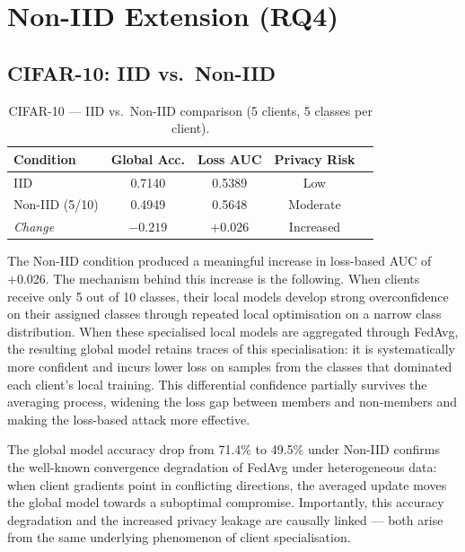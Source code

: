 \documentclass[12pt, a4paper]{report}
\begin{document}
\section{Non-IID Extension (RQ4)}

\subsection{CIFAR-10: IID vs.\ Non-IID}

\begin{table}[H]
  \centering
  \caption{CIFAR-10 --- IID vs.\ Non-IID comparison (5 clients, 5 classes per client).}
  \label{tab:noniid_cifar10}
  \begin{tabular}{lcccc}
    \toprule
    \textbf{Condition} & \textbf{Global Acc.} & \textbf{Loss AUC} & \textbf{Privacy Risk} \\
    \midrule
    IID             & 0.7140 & 0.5389 & Low \\
    Non-IID (5/10)  & 0.4949 & 0.5648 & Moderate \\
    \midrule
    \textit{Change} & $-0.219$ & $\mathbf{+0.026}$ & Increased \\
    \bottomrule
  \end{tabular}
\end{table}

The Non-IID condition produced a meaningful increase in loss-based AUC of +0.026.
The mechanism behind this increase is the following. When clients receive only
5 out of 10 classes, their local models develop strong overconfidence on their
assigned classes through repeated local optimisation on a narrow class distribution.
When these specialised local models are aggregated through FedAvg, the resulting
global model retains traces of this specialisation: it is systematically more
confident and incurs lower loss on samples from the classes that dominated each
client's local training. This differential confidence partially survives the
averaging process, widening the loss gap between members and non-members and
making the loss-based attack more effective.

The global model accuracy drop from 71.4\% to 49.5\% under Non-IID confirms
the well-known convergence degradation of FedAvg under heterogeneous data: when
client gradients point in conflicting directions, the averaged update moves the
global model towards a suboptimal compromise. Importantly, this accuracy degradation
and the increased privacy leakage are causally linked --- both arise from the same
underlying phenomenon of client specialisation.
\end{document}
